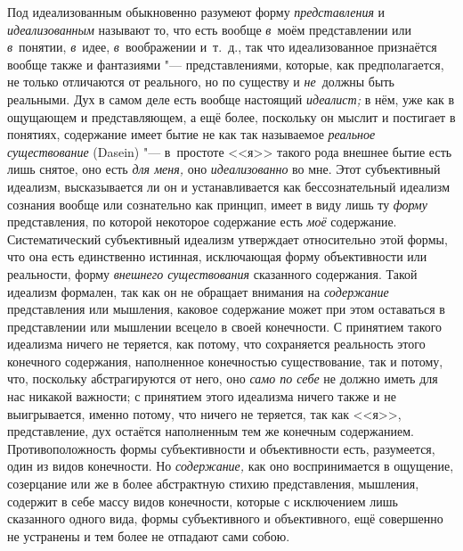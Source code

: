 Под идеализованным обыкновенно разумеют форму {\em представления} и
{\em идеализованным} называют то, что есть вообще
{\em в}~моём представлении или {\em в}~понятии, {\em в}~идее,
{\em в}~воображении и~т.~д., так что идеализованное
признаётся вообще также и фантазиями "--- представлениями, которые, как
предполагается, не только отличаются от реального, но по существу и
{\em не}~должны быть реальными. Дух в самом деле есть
вообще настоящий {\em идеалист;} в нём, уже как в
ощущающем и представляющем, а ещё более, поскольку он мыслит и постигает в
понятиях, содержание имеет бытие не как так называемое
{\em реальное существование} (Dasein) "--- в~простоте <<я>>
такого рода внешнее бытие есть лишь снятое, оно есть {\em для меня,} оно
{\em идеализованно} во мне. Этот субъективный идеализм,
высказывается ли он и устанавливается как бессознательный идеализм сознания
вообще или сознательно как принцип, имеет в виду лишь ту
{\em форму} представления, по которой некоторое
содержание есть {\em моё} содержание. Систематический
субъективный идеализм утверждает относительно этой формы, что она есть
единственно истинная, исключающая форму объективности или реальности, форму
{\em внешнего существования} сказанного содержания.
Такой идеализм формален, так как он не обращает внимания на
{\em содержание} представления или мышления, каковое
содержание может при этом оставаться в представлении или мышлении всецело в
своей конечности. С принятием такого идеализма ничего не теряется, как
потому, что сохраняется реальность этого конечного содержания, наполненное
конечностью существование, так и потому, что, поскольку абстрагируются от
него, оно {\em само по себе} не должно иметь для нас
никакой важности; с принятием этого идеализма ничего также и не
выигрывается, именно потому, что ничего не теряется, так как <<я>>,
представление, дух остаётся наполненным тем же конечным содержанием.
Противоположность формы субъективности и объективности есть, разумеется,
один из видов конечности. Но {\em содержание,} как оно
воспринимается в ощущение, созерцание или же в более абстрактную стихию
представления, мышления, содержит в себе массу видов конечности, которые с
исключением лишь сказанного одного вида, формы субъективного и
объективного, ещё совершенно не устранены и тем более не отпадают сами собою.

\bigskip
